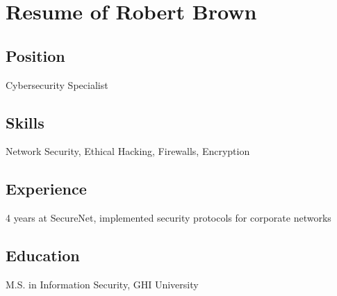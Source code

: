 \documentclass{article}
\begin{document}
\section*{Resume of Robert Brown}
\setcounter{page}{1}

\subsection*{Position}
Cybersecurity Specialist

\subsection*{Skills}
Network Security, Ethical Hacking, Firewalls, Encryption

\subsection*{Experience}
4 years at SecureNet, implemented security protocols for corporate networks

\subsection*{Education}
M.S. in Information Security, GHI University
\end{document}
